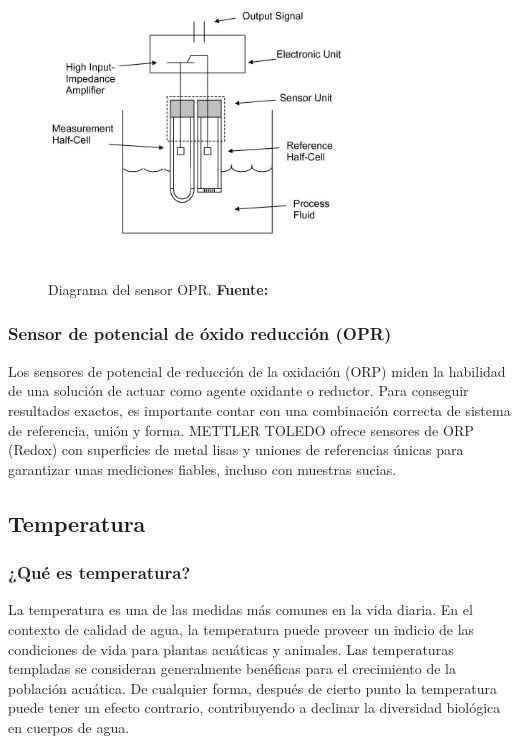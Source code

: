     \begin{figure}[ht]
        \centering
        \includegraphics[width=80mm, height=80mm]{Imagenes/cap2/ORP_Sensor_Image.jpg}
        \caption {Diagrama del sensor OPR. \textbf{Fuente:}
        \cite{orp_sensor_measure_nodate} }
        \label{fig:opr}
    \end{figure}


\subsubsection{Sensor de potencial de \'oxido reducción (OPR)}
Los sensores de potencial de reducción de la oxidación (ORP) miden la habilidad de una solución de actuar como agente oxidante o reductor. 
Para conseguir resultados exactos, es importante contar con una combinación correcta de sistema de referencia, unión y forma. METTLER TOLEDO ofrece sensores de ORP (Redox) con superficies de metal lisas y uniones de referencias únicas para garantizar unas mediciones fiables, incluso con muestras sucias.

\subsection{Temperatura}
\subsubsection{¿Qué es temperatura?}
La temperatura es una de las medidas más comunes en la vida diaria. 
En el contexto de calidad de agua, la temperatura puede proveer un indicio de las condiciones de vida para plantas acuáticas y animales.  
Las temperaturas templadas se consideran generalmente benéficas para el crecimiento de la población acuática. 
De cualquier forma, después de cierto punto la temperatura puede tener un efecto contrario, contribuyendo a declinar la diversidad biológica en cuerpos de agua.

